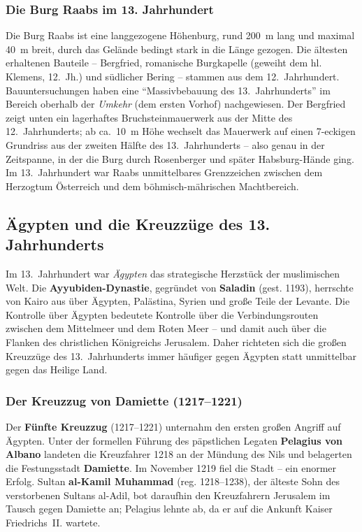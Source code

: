 \subsubsection{Die Burg Raabs im 13. Jahrhundert}\label{burg_raabs}

Die Burg Raabs ist eine langgezogene Höhenburg, rund 200~m lang und maximal 40~m breit, durch das Gelände bedingt stark in die Länge gezogen. Die ältesten erhaltenen Bauteile -- Bergfried, romanische Burgkapelle (geweiht dem hl. Klemens, 12.~Jh.) und südlicher Bering -- stammen aus dem 12.~Jahrhundert. Bauuntersuchungen haben eine \enquote{Massivbebauung des 13.~Jahrhunderts} im Bereich oberhalb der \textit{Umkehr} (dem ersten Vorhof) nachgewiesen. Der Bergfried zeigt unten ein lagerhaftes Bruchsteinmauerwerk aus der Mitte des 12.~Jahrhunderts; ab ca.~10~m Höhe wechselt das Mauerwerk auf einen 7-eckigen Grundriss aus der zweiten Hälfte des 13.~Jahrhunderts -- also genau in der Zeitspanne, in der die Burg durch Rosenberger und später Habsburg-Hände ging. Im 13.~Jahrhundert war Raabs unmittelbares Grenzzeichen zwischen dem Herzogtum Österreich und dem böhmisch-mährischen Machtbereich. \cite{noe_burgen_online_raabs,wiki_burg_raabs}

\subsection{Ägypten und die Kreuzzüge des 13. Jahrhunderts}\label{ägypten_kreuzzüge}

Im 13.~Jahrhundert war \textit{Ägypten} das strategische Herzstück der muslimischen Welt. Die \textbf{Ayyubiden-Dynastie}, gegründet von \textbf{Saladin} (gest. 1193), herrschte von Kairo aus über Ägypten, Palästina, Syrien und große Teile der Levante. Die Kontrolle über Ägypten bedeutete Kontrolle über die Verbindungsrouten zwischen dem Mittelmeer und dem Roten Meer -- und damit auch über die Flanken des christlichen Königreichs Jerusalem. Daher richteten sich die großen Kreuzzüge des 13.~Jahrhunderts immer häufiger gegen Ägypten statt unmittelbar gegen das Heilige Land.

\subsubsection{Der Kreuzzug von Damiette (1217--1221)}\label{5ter_kreuzzug}

Der \textbf{Fünfte Kreuzzug} (1217--1221) unternahm den ersten großen Angriff auf Ägypten. Unter der formellen Führung des päpstlichen Legaten \textbf{Pelagius von Albano} landeten die Kreuzfahrer 1218 an der Mündung des Nils und belagerten die Festungsstadt \textbf{Damiette}. Im November 1219 fiel die Stadt -- ein enormer Erfolg. Sultan \textbf{al-Kamil Muhammad} (reg. 1218--1238), der älteste Sohn des verstorbenen Sultans al-Adil, bot daraufhin den Kreuzfahrern Jerusalem im Tausch gegen Damiette an; Pelagius lehnte ab, da er auf die Ankunft Kaiser Friedrichs~II. wartete.

